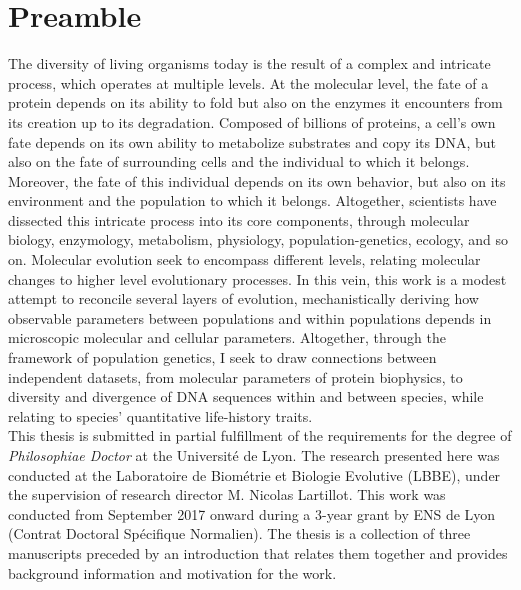 \chapter*{Preamble}
The diversity of living organisms today is the result of a complex and intricate process, which operates at multiple levels.
At the molecular level, the fate of a protein depends on its ability to fold but also on the enzymes it encounters from its creation up to its degradation.
Composed of billions of proteins, a cell's own fate depends on its own ability to metabolize substrates and copy its \acrshort{DNA}, but also on the fate of surrounding cells and the individual to which it belongs.
Moreover, the fate of this individual depends on its own behavior, but also on its environment and the population to which it belongs.
Altogether, scientists have dissected this intricate process into its core components, through molecular biology, enzymology, metabolism, physiology, population-genetics, ecology, and so on.
Molecular evolution seek to encompass different levels, relating molecular changes to higher level evolutionary processes.
In this vein, this work is a modest attempt to reconcile several layers of evolution, mechanistically deriving how observable parameters between populations and within populations depends in microscopic molecular and cellular parameters.
Altogether, through the framework of population genetics, I seek to draw connections between independent datasets, from molecular parameters of protein biophysics, to diversity and divergence of \acrshort{DNA} sequences within and between species, while relating to species' quantitative life-history traits.\\

This thesis is submitted in partial fulfillment of the requirements for the degree of \emph{Philosophiae Doctor} at the Université de Lyon.
The research presented here was conducted at the Laboratoire de Biométrie et Biologie Evolutive (LBBE), under the supervision of research director M. Nicolas Lartillot.
This work was conducted from September 2017 onward during a 3-year grant by ENS de Lyon (Contrat Doctoral Spécifique Normalien).
The thesis is a collection of three manuscripts preceded by an introduction that relates them together and provides background information and motivation for the work.